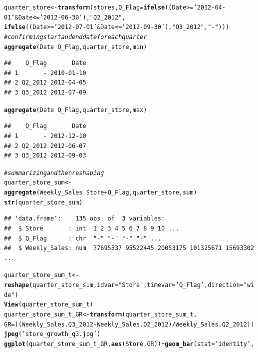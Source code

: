 \documentclass{article}\usepackage[]{graphicx}\usepackage[]{color}
\makeatletter
\newcommand{\hlstr}[1]{\textcolor[rgb]{0.192,0.494,0.8}{#1}}%
\newcommand{\hlcom}[1]{\textcolor[rgb]{0.678,0.584,0.686}{\textit{#1}}}%
\newcommand{\hlopt}[1]{\textcolor[rgb]{0,0,0}{#1}}%
\newcommand{\hlstd}[1]{\textcolor[rgb]{0.345,0.345,0.345}{#1}}%
\newcommand{\hlkwb}[1]{\textcolor[rgb]{0.69,0.353,0.396}{#1}}%
\newcommand{\hlkwc}[1]{\textcolor[rgb]{0.333,0.667,0.333}{#1}}%
\newcommand{\hlkwd}[1]{\textcolor[rgb]{0.737,0.353,0.396}{\textbf{#1}}}%
\newenvironment{kframe}{%
 \def\at@end@of@kframe{}%
 \ifinner\ifhmode%
  \def\at@end@of@kframe{\end{minipage}}%
  \begin{minipage}{\columnwidth}%
 \fi\fi%
 \def\FrameCommand##1{\hskip\@totalleftmargin \hskip-\fboxsep
 \colorbox{shadecolor}{##1}\hskip-\fboxsep
     \hskip-\linewidth \hskip-\@totalleftmargin \hskip\columnwidth}%
 \MakeFramed {\advance\hsize-\width
   \@totalleftmargin\z@ \linewidth\hsize
   \@setminipage}}%
 {\par\unskip\endMakeFramed%
 \at@end@of@kframe}
\newenvironment{knitrout}{}{} %
\makeatother
\begin{document}
\begin{knitrout}
\begin{kframe}
\begin{alltt}
\hlstd{quarter_store} \hlkwb{<-} \hlkwd{transform}\hlstd{(stores,} \hlkwc{Q_Flag}\hlstd{=} \hlkwd{ifelse}\hlstd{((Date}\hlopt{>=}\hlstr{'2012-04-01'} \hlopt{&} \hlstd{Date}\hlopt{<=} \hlstr{'2012-06-30'}\hlstd{),}\hlstr{"Q2_2012"}\hlstd{,}
                                                  \hlkwd{ifelse}\hlstd{((Date}\hlopt{>=}\hlstr{'2012-07-01'} \hlopt{&} \hlstd{Date}\hlopt{<=} \hlstr{'2012-09-30'}\hlstd{),}\hlstr{"Q3_2012"}\hlstd{,}\hlstr{"-"}\hlstd{)))}
\hlcom{# confirming start and end date for each quarter}
\hlkwd{aggregate}\hlstd{(Date} \hlopt{~} \hlstd{Q_Flag, quarter_store, min)}
\end{alltt}
\begin{verbatim}
##    Q_Flag       Date
## 1       - 2010-01-10
## 2 Q2_2012 2012-04-05
## 3 Q3_2012 2012-07-09
\end{verbatim}
\begin{alltt}
\hlkwd{aggregate}\hlstd{(Date} \hlopt{~} \hlstd{Q_Flag, quarter_store, max)}
\end{alltt}
\begin{verbatim}
##    Q_Flag       Date
## 1       - 2012-12-10
## 2 Q2_2012 2012-06-07
## 3 Q3_2012 2012-09-03
\end{verbatim}
\begin{alltt}
\hlcom{# summarizing and then reshaping}
\hlstd{quarter_store_sum} \hlkwb{<-} \hlkwd{aggregate}\hlstd{(Weekly_Sales}\hlopt{~}\hlstd{Store}\hlopt{+}\hlstd{Q_Flag,quarter_store,sum)}
\hlkwd{str}\hlstd{(quarter_store_sum)}
\end{alltt}
\begin{verbatim}
## 'data.frame':	135 obs. of  3 variables:
##  $ Store       : int  1 2 3 4 5 6 7 8 9 10 ...
##  $ Q_Flag      : chr  "-" "-" "-" "-" ...
##  $ Weekly_Sales: num  77695537 95522445 20053175 101325671 15693302 ...
\end{verbatim}
\begin{alltt}
\hlstd{quarter_store_sum_t} \hlkwb{<-} \hlkwd{reshape}\hlstd{(quarter_store_sum,}\hlkwc{idvar}\hlstd{=}\hlstr{"Store"}\hlstd{,}\hlkwc{timevar} \hlstd{=}\hlstr{'Q_Flag'}\hlstd{,}\hlkwc{direction}\hlstd{=}\hlstr{"wide"}\hlstd{)}
\hlkwd{View}\hlstd{(quarter_store_sum_t)}
\hlstd{quarter_store_sum_t_GR} \hlkwb{<-} \hlkwd{transform}\hlstd{(quarter_store_sum_t,}
                                        \hlkwc{GR}\hlstd{=((Weekly_Sales.Q3_2012}\hlopt{-}\hlstd{Weekly_Sales.Q2_2012)}\hlopt{/}\hlstd{Weekly_Sales.Q2_2012))}
\hlkwd{jpeg}\hlstd{(}\hlstr{'store_growth_q3.jpg'}\hlstd{)}
\hlkwd{ggplot}\hlstd{(quarter_store_sum_t_GR,} \hlkwd{aes}\hlstd{(Store, GR))}\hlopt{+}\hlkwd{geom_bar}\hlstd{(}\hlkwc{stat}\hlstd{=}\hlstr{'identity'}\hlstd{,}

\end{alltt}
\end{kframe}
\end{knitrout}
\end{document}
